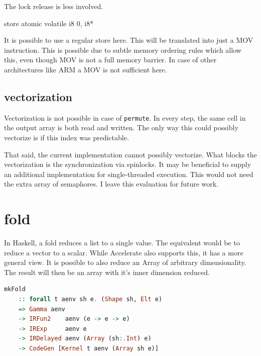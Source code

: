 \documentclass[a4paper,bibliography=totocnumbered,parskip,headsepline]{scrbook}
\begin{document}
The lock release is less involved.
\begin{lstinline}
                store atomic volatile i8 0, i8* %
\end{lstinline}
It is possible to use a regular store here.
This will be translated into just a MOV instruction.
This is possible due to subtle memory ordering rules which allow this, even though MOV is not a full memory barrier.
In case of other architectures like ARM a MOV is not sufficient here.

\subsection{vectorization}
Vectorization is not possible in case of \lstinline[language=haskell]!permute!.
In every step, the same cell in the output array is both read and written.
The only way this could possibly vectorize is if this index was predictable.

That said, the current implementation cannot possibly vectorize.
What blocks the vectorization is the synchronization via spinlocks.
It may be beneficial to supply an additional implementation for single-threaded execution.
This would not need the extra array of semaphores.
I leave this evaluation for future work.

\section{fold}
In Haskell, a fold reduces a list to a single value.
The equivalent would be to reduce a vector to a scalar.
While Accelerate also supports this, it has a more general view.
It is possible to also reduce an Array of arbitrary dimensionality.
The result will then be an array with it's inner dimension reduced.

\begin{lstlisting}[language=haskell]
mkFold
    :: forall t aenv sh e. (Shape sh, Elt e)
    => Gamma aenv
    -> IRFun2    aenv (e -> e -> e)
    -> IRExp     aenv e
    -> IRDelayed aenv (Array (sh:.Int) e)
    -> CodeGen [Kernel t aenv (Array sh e)]
\end{lstlisting}
\end{document}
